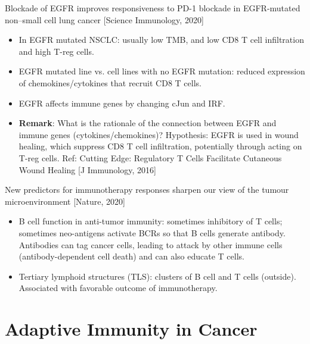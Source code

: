 \documentclass{report}
\begin{document}
Blockade of EGFR improves responsiveness to PD-1 blockade in EGFR-mutated non–small cell lung cancer [Science Immunology, 2020]
\begin{itemize}
	\item In EGFR mutated NSCLC: usually low TMB, and low CD8 T cell infiltration and high T-reg cells.
	
	\item EGFR mutated line vs. cell lines with no EGFR mutation: reduced expression of chemokines/cytokines that recruit CD8 T cells.
	
	\item EGFR affects immune genes by changing cJun and IRF.
	
	\item \textbf{Remark}: What is the rationale of the connection between EGFR and immune genes (cytokines/chemokines)? Hypothesis: EGFR is used in wound healing, which suppress CD8 T cell infiltration, potentially through acting on T-reg cells. Ref: Cutting Edge: Regulatory T Cells Facilitate Cutaneous Wound Healing [J Immunology, 2016]
\end{itemize}

New predictors for immunotherapy responses sharpen our view of the tumour microenvironment [Nature, 2020]
\begin{itemize}
	\item B cell function in anti-tumor immunity: sometimes inhibitory of T cells; sometimes neo-antigens activate BCRs so that B cells generate   antibody. Antibodies can tag cancer cells, leading to attack by other immune cells (antibody-dependent cell death) and can also educate T cells.
	
	\item Tertiary lymphoid structures (TLS): clusters of B cell and T cells (outside). Associated with favorable outcome of immunotherapy.
\end{itemize}
\section{Adaptive Immunity in Cancer}
\end{document}
